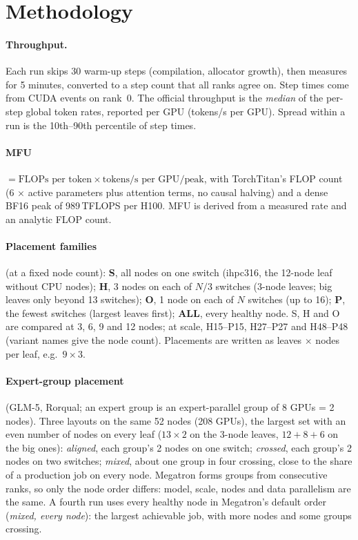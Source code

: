 \section{Methodology}
\label{sec:method}

\paragraph{Throughput.} Each run skips 30 warm-up steps (compilation, allocator growth), then measures
for 5 minutes, converted to a step count that all ranks agree on. Step times come from CUDA events on
rank~0. The official throughput is the \emph{median} of the per-step global token rates, reported per
GPU (tokens/s per GPU). Spread within a run is the 10th--90th percentile of step times.

\paragraph{MFU} $= \text{FLOPs per token} \times \text{tokens/s per GPU} / \text{peak}$, with TorchTitan's
FLOP count (6 $\times$ active parameters plus attention terms, no causal halving) and a dense BF16 peak of
989\,TFLOPS per H100. MFU is derived from a measured rate and an analytic FLOP count.

\paragraph{Placement families} (at a fixed node count):
\textbf{S}, all nodes on one switch (ihpc316, the 12-node leaf without CPU nodes);
\textbf{H}, 3 nodes on each of $N/3$ switches (3-node leaves; big leaves only beyond 13 switches);
\textbf{O}, 1 node on each of $N$ switches (up to 16);
\textbf{P}, the fewest switches (largest leaves first);
\textbf{ALL}, every healthy node.
S, H and O are compared at 3, 6, 9 and 12 nodes; at scale, H15--P15, H27--P27 and H48--P48 (variant
names give the node count). Placements are written as leaves $\times$ nodes per leaf, e.g.\ $9\times3$.

\paragraph{Expert-group placement} (GLM-5, Rorqual; an expert group is an expert-parallel group of 8
GPUs = 2 nodes). Three layouts on the same 52 nodes (208 GPUs), the largest set with an even number of
nodes on every leaf ($13\times2$ on the 3-node leaves, $12+8+6$ on the big ones): \emph{aligned}, each
group's 2 nodes on one switch; \emph{crossed}, each group's 2 nodes on two switches; \emph{mixed}, about
one group in four crossing, close to the share of a production job on every node. Megatron forms groups
from consecutive ranks, so only the node order differs: model, scale, nodes and data parallelism are the
same. A fourth run uses every healthy node in Megatron's default order (\emph{mixed, every node}): the
largest achievable job, with more nodes and some groups crossing.

